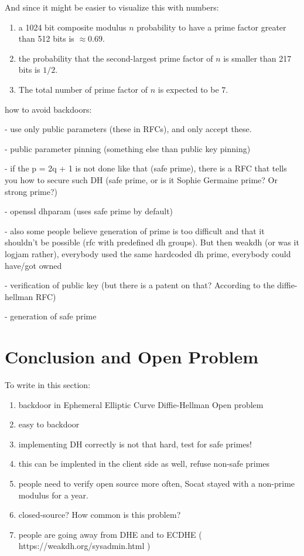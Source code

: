 \documentclass[a4paper,11pt,twocolumn]{article}
\begin{document}
And since it might be easier to visualize this with numbers:

\begin{enumerate}
    \item a 1024 bit composite modulus $n$ probability to have a prime factor greater than 512 bits is $\approx 0.69$.
    \item the probability that the second-largest prime factor of $n$ is smaller than 217 bits is $1/2$.
    \item The total number of prime factor of $n$ is expected to be $7$.
\end{enumerate}

how to avoid backdoors:

- use only public parameters (these in RFCs), and only accept these. 

- public parameter pinning (something else than public key pinning)

- if the p = 2q + 1 is not done like that (safe prime), there is a RFC that tells you how to secure such DH (safe prime, or is it Sophie Germaine prime? Or strong prime?)

- openssl dhparam (uses safe prime by default)

- also some people believe generation of prime is too difficult and that it shouldn't be possible (rfc with predefined dh groups). But then weakdh (or was it logjam rather), everybody used the same hardcoded dh prime, everybody could have/got owned

- verification of public key (but there is a patent on that? According to the diffie-hellman RFC)

- generation of safe prime


\section{Conclusion and Open Problem}

To write in this section:

\begin{enumerate}
\item backdoor in Ephemeral Elliptic Curve Diffie-Hellman Open problem
\item easy to backdoor
\item  implementing DH correctly is not that hard, test for safe primes!
\item  this can be implented in the client side as well, refuse non-safe primes
\item  people need to verify open source more often, Socat stayed with a non-prime modulus for a year.
\item  closed-source? How common is this problem?
\item  people are going away from DHE and to ECDHE ( https://weakdh.org/sysadmin.html )
\end{enumerate}
\end{document}

